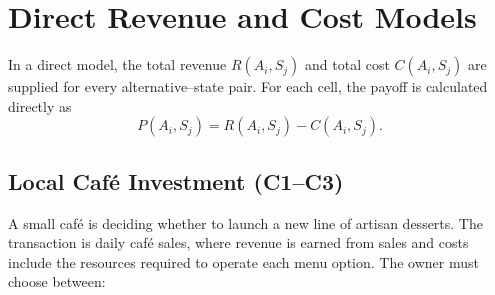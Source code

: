 
\section{Direct Revenue and Cost Models}
\label{sec:direct-revenue-cost-models}


\vspace{0.8cm}

In a direct model, the total revenue \(R(A_i,S_j)\) and total cost
\(C(A_i,S_j)\) are supplied for every alternative--state pair. For
each cell, the payoff is calculated directly as
\[
P(A_i,S_j)=R(A_i,S_j)-C(A_i,S_j).
\]

\subsection{Local Café Investment (C1--C3)}
\label{sec:problem3-local-cafe-investment-c1-c3}

A small café is deciding whether to launch a new line of artisan desserts.
The transaction is daily café sales, where revenue is earned from sales and
costs include the resources required to operate each menu option. The owner
must choose between:

